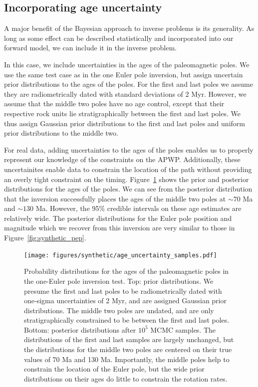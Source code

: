 \documentclass[11pt,letterpaper]{article}
\begin{document}
\subsection*{Incorporating age uncertainty}
\label{sec:age_uncertainty}
A major benefit of the Bayesian approach to inverse problems is its generality. As long as some effect can be described statistically and incorporated into our forward model, we can include it in the inverse problem.

In this case, we include uncertainties in the ages of the paleomagnetic poles. We use the same test case as in the one Euler pole inversion, but assign uncertain prior distributions to the ages of the poles. For the first and last poles we assume they are radiometrically dated with standard deviations of 2 Myr. However, we assume that the middle two poles have no age control, except that their
respective rock units lie stratigraphically between the first and last poles. We thus assign Gaussian prior distributions to the first and last poles and uniform prior distributions
to the middle two.

For real data, adding uncertainties to the ages of the poles enables us to properly represent our knowledge of the constraints on the APWP. Additionally, these uncertainites enable data to constrain the location of the path without providing an overly tight constraint on the timing.
Figure~\ref{fig:age_uncertainty_samples} shows the prior and posterior distributions for the ages of the poles. We can see from the posterior distribution that the inversion successfully places the ages of the middle two poles at $\sim70$ Ma and $\sim130$ Ma. However, the 95\% credible intervals on these age estimates are relatively wide. The posterior distributions for the Euler pole position and magnitude which we recover from this inversion are very similar to those in Figure~\ref{fig:synthetic_pep}.

\begin{figure}
\texttt{[image: figures/synthetic/age\_uncertainty\_samples.pdf]}
\caption[Probability distributions for ages of the paleomagnetic poles in the one-Euler pole inversion test.]{Probability distributions for the ages of the paleomagnetic poles in the one-Euler pole inversion test. Top: prior distributions. We presume the first and last poles to be radiometrically dated with one-sigma uncertainties of 2 Myr, and are assigned Gaussian prior distributions. The middle two poles are undated, and are only stratigraphically constrained to be between the first and last poles. Bottom: posterior distributions after $10^5$ MCMC samples. The distributions of the first and last samples are largely unchanged, but the distributions for the middle two poles are centered on their true values of 70 Ma and 130 Ma. Importantly, the middle poles help to constrain the location of the Euler pole, but the wide prior distributions on their ages do little to constrain the rotation rates.}
\label{fig:age_uncertainty_samples}
\end{figure}
\end{document}
